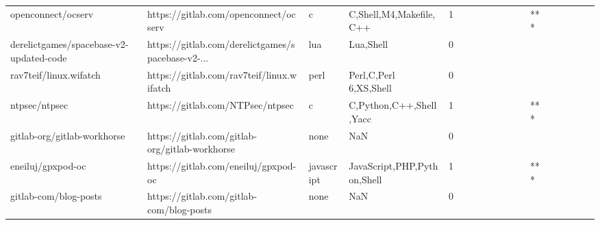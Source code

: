\begin{tabular}{llllrlllllllllllll}
openconnect/ocserv                                 &              https://gitlab.com/openconnect/ocserv &                 c &                            C,Shell,M4,Makefile,C++ &       1 &         &        &           &                &                 &        &           &       *** &          &          &       &              &          \\
derelictgames/spacebase-v2-updated-code            &  https://gitlab.com/derelictgames/spacebase-v2-... &               lua &                                          Lua,Shell &       0 &         &        &           &                &                 &        &           &           &          &          &       &              &          \\
rav7teif/linux.wifatch                             &          https://gitlab.com/rav7teif/linux.wifatch &              perl &                             Perl,C,Perl 6,XS,Shell &       0 &         &        &           &                &                 &        &           &           &          &          &       &              &          \\
ntpsec/ntpsec                                      &                   https://gitlab.com/NTPsec/ntpsec &                 c &                            C,Python,C++,Shell,Yacc &       1 &         &        &           &                &                 &        &           &       *** &          &          &       &              &          \\
gitlab-org/gitlab-workhorse                        &     https://gitlab.com/gitlab-org/gitlab-workhorse &              none &                                                NaN &       0 &         &        &           &                &                 &        &           &           &          &          &       &              &          \\
eneiluj/gpxpod-oc                                  &               https://gitlab.com/eneiluj/gpxpod-oc &        javascript &                        JavaScript,PHP,Python,Shell &       1 &         &        &           &                &                 &        &           &       *** &          &          &       &              &          \\
gitlab-com/blog-posts                              &           https://gitlab.com/gitlab-com/blog-posts &              none &                                                NaN &       0 &         &        &           &                &                 &        &           &           &          &          &       &              &          \\

\end{tabular}
